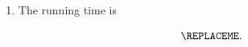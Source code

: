 \begin{enumerate}[label=(\alph*)]
\item


  The running time is
  \begin{blue}
    \[
      \REPLACEME
      .\]
  \end{blue}
  
\end{enumerate}


